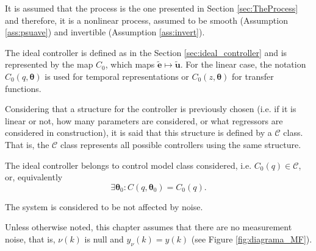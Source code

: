 \begin{assum}
   It is assumed that the process is the one presented in Section \ref{sec:TheProcess} and therefore, it is a nonlinear process, assumed to be smooth (Assumption \ref{ass:psuave}) and invertible (Assumption \ref{ass:invert}).
\end{assum}

\begin{defn}\label{def:idealControler}
   The ideal controller is defined as in the Section \ref{sec:ideal_controller} and is represented by the map $C_0 $, which maps $\tilde{\bm{e}}\mapsto \tilde{\bm{u}}$. For the linear case, the notation $C_0(q,\bm{\theta})$ is used for temporal representations or $C_0 (z,\bm{\theta})$ for transfer functions.
\end{defn}

Considering that a structure for the controller is previously chosen (i.e. if it is linear or not, how many parameters are considered, or what regressors are considered in construction), it is said that this structure is defined by a $\mathscr{C}$ class. That is, the $\mathscr{C}$ class represents all possible controllers using the same structure.

\begin{assum}\label{ass:machedControl} %
   The ideal controller belongs to control model class considered, i.e. $C_0(q) \in \mathscr{C}$, or, equivalently
   \begin{equation}
      \exists \bm{\theta}_0 : C(q,\bm{\theta}_0)=C_0(q)
      \label{eq:assumpMatched}.
   \end{equation}
\end{assum}

\begin{assum}
   \label{ass:noiseFree} 
   The system is considered to be not affected by noise.
\end{assum}
Unless otherwise noted, this chapter assumes that there are no measurement noise, that is, $\nu(k)$ is null and $y_{\nu}(k) = y(k)$ (see Figure \ref{fig:diagrama_MF}).

